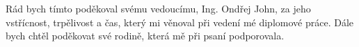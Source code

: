 \documentclass[czech,master,unicode]{ctufit-thesis}
\theoremstyle{plain}
\theoremstyle{definition}
\theoremstyle{remark}
\numberwithin{theorem}{chapter}
\begin{document}
 
\frontmatter\frontmatterinit %


\thispagestyle{empty}\cleardoublepage\maketitle %

\imprintpage %

\tableofcontents %
\listoffigures %
\begingroup
\let\clearpage\relax
\listoftables %
\lstlistoflistings %
\endgroup

\begin{acknowledgmentpage}
	Rád bych tímto poděkoval svému vedoucímu, Ing. Ondřej John, za jeho vstřícnost, trpělivost a čas, který mi věnoval při vedení mé diplomové práce. Dále bych chtěl poděkovat své rodině, která mě při psaní podporovala.
\end{acknowledgmentpage} 
\end{document}
